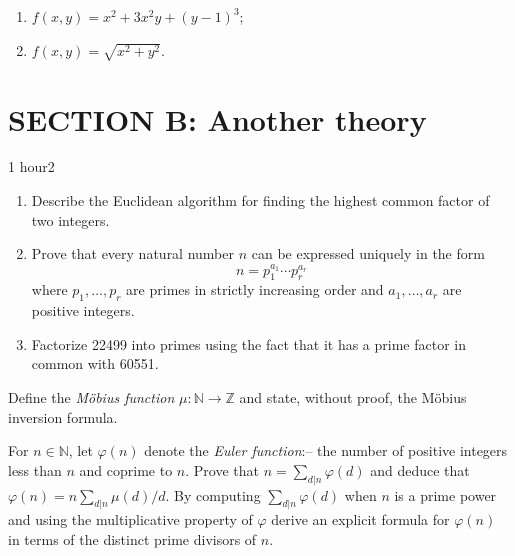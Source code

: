 \documentclass{exams}
\newcommand{\N}{\mathbb{N}}
\newcommand{\Z}{\mathbb{Z}}
\begin{document}
\begin{exam}
\begin{question}
\begin{enumerate}
\begin{enumerate}
\item $f(x,y) = x^2 + 3x^2y + (y-1)^3$;
\item $f(x,y) = \sqrt{x^2+y^2}$.
\end{enumerate}
\end{enumerate}
\end{question}


\section{SECTION B: Another theory}{1 hour}{2}


\begin{question}
\begin{enumerate}
\item Describe the Euclidean algorithm for finding the
highest common factor of two integers.
\item Prove that every natural number $n$ can be expressed
uniquely in the form
$$
n=p_1^{a_1}\cdots p_r^{a_r}
$$
where $p_1,\ldots,p_r$ are primes in strictly increasing order
and $a_1,\ldots,a_r$ are positive integers.
\item Factorize 22499 into primes using the fact that it has a
prime factor in common with 60551.
\end{enumerate}
\end{question}

\newpage

\begin{question}
Define the {\it M\"obius function} $\mu \colon \N \to \Z$
and state, without proof, the M\"obius inversion formula.

For $n \in \N$, let $\varphi(n)$ denote the {\it Euler
function}:-- the number of positive integers less than $n$ and coprime
to $n$. Prove that $n= \displaystyle{\sum_{d\vert n}} \varphi(d)$ and
deduce that $\varphi(n) = n\displaystyle{\sum_{d\vert n}} \mu(d)/d$.
By computing $\displaystyle{\sum_{d\vert n}} \varphi(d)$ when $n$ is a
prime power and using the multiplicative property of $\varphi$ derive
an explicit formula for $\varphi(n)$ in terms of the distinct prime
divisors of $n$.


\end{question}
\end{exam}
\end{document}
